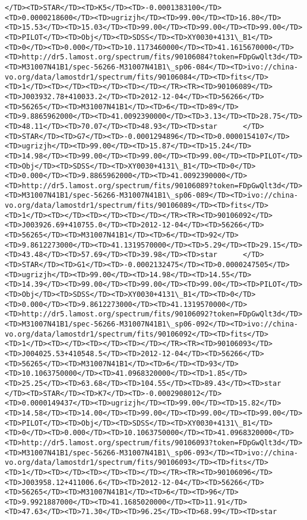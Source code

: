 \documentclass[11pt]{article}
\begin{document}
\begin{Verbatim}[commandchars=\\\{\}]
</TD><TD>STAR</TD><TD>K5</TD><TD>-0.0001383100</TD><TD>0.0000218600</TD><TD>ugrizjh</TD><TD>99.00</TD><TD>16.80</TD><TD>15.53</TD><TD>15.03</TD><TD>99.00</TD><TD>99.00</TD><TD>99.00</TD><TD>PILOT</TD><TD>Obj</TD><TD>SDSS</TD><TD>XY0030+4131\_B1</TD><TD>0</TD><TD>0.000</TD><TD>10.1173460000</TD><TD>41.1615670000</TD><TD>http://dr5.lamost.org/spectrum/fits/90106084?token=FDpGwQlt3d</TD><TD>M31007N41B1/spec-56266-M31007N41B1\_sp06-084</TD><TD>ivo://china-vo.org/data/lamostdr1/spectrum/fits/90106084</TD><TD>fits</TD><TD>1</TD><TD></TD><TD></TD><TD></TD></TR><TR><TD>90106089</TD><TD>J003932.78+410033.2</TD><TD>2012-12-04</TD><TD>56266</TD><TD>56265</TD><TD>M31007N41B1</TD><TD>6</TD><TD>89</TD><TD>9.8865962000</TD><TD>41.0092390000</TD><TD>3.13</TD><TD>28.75</TD><TD>48.11</TD><TD>70.07</TD><TD>48.93</TD><TD>star      </TD><TD>STAR</TD><TD>G7</TD><TD>-0.0001294896</TD><TD>0.0000154107</TD><TD>ugrizjh</TD><TD>99.00</TD><TD>15.87</TD><TD>15.24</TD><TD>14.98</TD><TD>99.00</TD><TD>99.00</TD><TD>99.00</TD><TD>PILOT</TD><TD>Obj</TD><TD>SDSS</TD><TD>XY0030+4131\_B1</TD><TD>0</TD><TD>0.000</TD><TD>9.8865962000</TD><TD>41.0092390000</TD><TD>http://dr5.lamost.org/spectrum/fits/90106089?token=FDpGwQlt3d</TD><TD>M31007N41B1/spec-56266-M31007N41B1\_sp06-089</TD><TD>ivo://china-vo.org/data/lamostdr1/spectrum/fits/90106089</TD><TD>fits</TD><TD>1</TD><TD></TD><TD></TD><TD></TD></TR><TR><TD>90106092</TD><TD>J003926.69+410755.0</TD><TD>2012-12-04</TD><TD>56266</TD><TD>56265</TD><TD>M31007N41B1</TD><TD>6</TD><TD>92</TD><TD>9.8612273000</TD><TD>41.1319570000</TD><TD>5.29</TD><TD>29.15</TD><TD>43.48</TD><TD>57.69</TD><TD>39.98</TD><TD>star      </TD><TD>STAR</TD><TD>G1</TD><TD>-0.0002132475</TD><TD>0.0000247505</TD><TD>ugrizjh</TD><TD>99.00</TD><TD>14.98</TD><TD>14.55</TD><TD>14.39</TD><TD>99.00</TD><TD>99.00</TD><TD>99.00</TD><TD>PILOT</TD><TD>Obj</TD><TD>SDSS</TD><TD>XY0030+4131\_B1</TD><TD>0</TD><TD>0.000</TD><TD>9.8612273000</TD><TD>41.1319570000</TD><TD>http://dr5.lamost.org/spectrum/fits/90106092?token=FDpGwQlt3d</TD><TD>M31007N41B1/spec-56266-M31007N41B1\_sp06-092</TD><TD>ivo://china-vo.org/data/lamostdr1/spectrum/fits/90106092</TD><TD>fits</TD><TD>1</TD><TD></TD><TD></TD><TD></TD></TR><TR><TD>90106093</TD><TD>J004025.53+410548.5</TD><TD>2012-12-04</TD><TD>56266</TD><TD>56265</TD><TD>M31007N41B1</TD><TD>6</TD><TD>93</TD><TD>10.1063750000</TD><TD>41.0968320000</TD><TD>1.85</TD><TD>25.25</TD><TD>63.68</TD><TD>104.55</TD><TD>89.43</TD><TD>star      </TD><TD>STAR</TD><TD>K7</TD><TD>-0.0002908012</TD><TD>0.0000149437</TD><TD>ugrizjh</TD><TD>99.00</TD><TD>15.82</TD><TD>14.58</TD><TD>14.00</TD><TD>99.00</TD><TD>99.00</TD><TD>99.00</TD><TD>PILOT</TD><TD>Obj</TD><TD>SDSS</TD><TD>XY0030+4131\_B1</TD><TD>0</TD><TD>0.000</TD><TD>10.1063750000</TD><TD>41.0968320000</TD><TD>http://dr5.lamost.org/spectrum/fits/90106093?token=FDpGwQlt3d</TD><TD>M31007N41B1/spec-56266-M31007N41B1\_sp06-093</TD><TD>ivo://china-vo.org/data/lamostdr1/spectrum/fits/90106093</TD><TD>fits</TD><TD>1</TD><TD></TD><TD></TD><TD></TD></TR><TR><TD>90106096</TD><TD>J003958.12+411006.6</TD><TD>2012-12-04</TD><TD>56266</TD><TD>56265</TD><TD>M31007N41B1</TD><TD>6</TD><TD>96</TD><TD>9.9921887000</TD><TD>41.1685020000</TD><TD>11.91</TD><TD>47.63</TD><TD>71.30</TD><TD>96.25</TD><TD>68.99</TD><TD>star      
\end{Verbatim}
\end{document}
